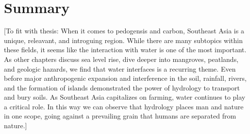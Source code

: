 \section{Summary}
[To fit with thesis: When it comes to pedogensis and carbon, Southeast Asia is a unique, releavant, and introguing region. While there are many subtopics within these fields, it seems like the interaction with water is one of the most important. As other chapters discuss sea level rise, dive deeper into mangroves, peatlands, and geologic hazards, we find that water interfaces is a recurring theme. Even before major anthropogenic expansion and interference in the soil, rainfall, rivers, and the formation of islands demonstrated the power of hydrology to transport and bury soils. As Southeast Asia capitalizes on farming, water continues to play a critical role. In this way we can observe that hydrology places man and nature in one scope, going against a prevailing grain that humans are separated from nature.]
